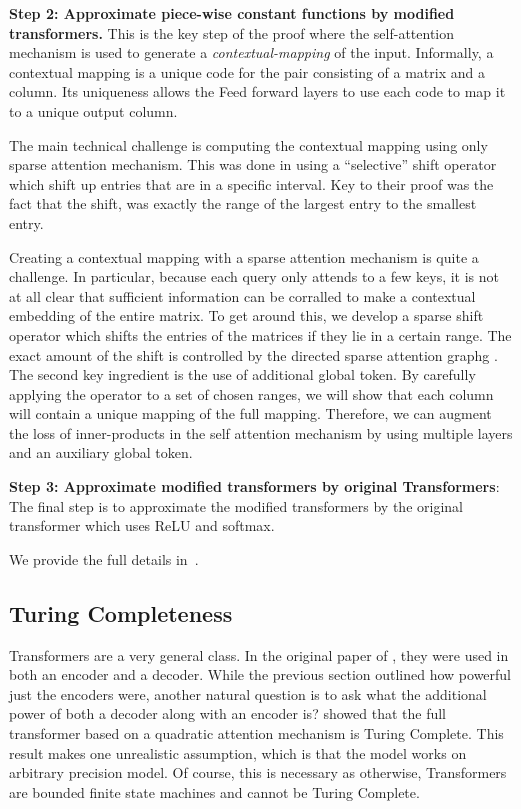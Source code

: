 \documentclass{article}
\begin{document}
\textbf{Step 2:  Approximate piece-wise constant functions by modified transformers.} 
    This is the key step  of the proof where  the self-attention mechanism is used to generate a \emph{contextual-mapping} of the input. Informally, a contextual mapping is a unique code
    for the pair consisting of a matrix  and a column. Its uniqueness allows
    the Feed forward layers to use each code to map it to a unique output column. 
    
    The main technical challenge is computing the contextual mapping using only sparse attention mechanism. 
    This was done in \cite{Yun19} using a ``selective'' shift operator which shift up entries that are in a 
    specific interval. Key to their proof was the fact that the shift, was exactly the range of the largest 
    entry to the smallest entry.  
    
    Creating a contextual mapping with a sparse attention mechanism is quite a challenge.
    In particular, because each query only attends to a few keys, it is not at all clear
    that sufficient information can be corralled to make a contextual embedding of the 
    entire matrix. To get around this, we develop a sparse shift operator which shifts the entries of the matrices if they lie in a certain range. The exact amount of the shift is controlled by the directed sparse attention graphg . The second key ingredient is the use of additional global token.  By carefully applying the operator
    to a set of chosen ranges, we will show that each column will contain a unique mapping of the
    full mapping.   Therefore, we can   
    augment the loss of inner-products in the self attention mechanism by using multiple 
    layers and an auxiliary global token. 
    
\textbf{Step 3: Approximate modified transformers by original Transformers}: The final 
step is to approximate the modified transformers by the original transformer which uses ReLU and 
softmax. 

We provide the full details in~.

\subsection{Turing Completeness}
Transformers are a very general class. In the original paper of \citet{vaswani2017attention}, they were used 
in both an encoder and a decoder. While the previous section outlined how powerful just the encoders were,  another natural question is to ask what the
additional power of both a decoder along with an encoder is? \citet{Perez19} showed that the 
full  transformer based on a quadratic attention mechanism is Turing Complete. This result 
makes one  unrealistic assumption, which is that the model works on arbitrary precision 
model. Of course,  this is necessary as otherwise, Transformers are bounded finite 
state machines and cannot be Turing Complete. 
\end{document}
